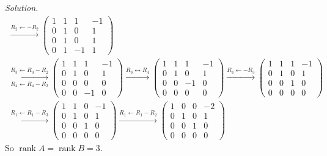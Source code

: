 \documentclass[12pt]{article}
\DeclareMathOperator{\rank}{rank}
\theoremstyle{definition}
\newenvironment{solution}{\par\noindent\textit{Solution.}\ }{\par\smallskip}
\begin{document}
\begin{solution}
\[\begin{gathered}
\xrightarrow{R_2\leftarrow-R_2}
\begin{pmatrix}1&1&1&-1\\0&1&0&1\\0&1&0&1\\0&1&-1&1\end{pmatrix}
\\
\xrightarrow[R_4\leftarrow R_4-R_2]{R_3\leftarrow R_3-R_2}
\begin{pmatrix}1&1&1&-1\\0&1&0&1\\0&0&0&0\\0&0&-1&0\end{pmatrix}
\xrightarrow{R_3\leftrightarrow R_4}
\begin{pmatrix}1&1&1&-1\\0&1&0&1\\0&0&-1&0\\0&0&0&0\end{pmatrix}
\xrightarrow{R_3\leftarrow-R_3}
\begin{pmatrix}1&1&1&-1\\0&1&0&1\\0&0&1&0\\0&0&0&0\end{pmatrix}
\\
\xrightarrow{R_1\leftarrow R_1-R_3}
\begin{pmatrix}1&1&0&-1\\0&1&0&1\\0&0&1&0\\0&0&0&0\end{pmatrix}
\xrightarrow{R_1\leftarrow R_1-R_2}
\begin{pmatrix}1&0&0&-2\\0&1&0&1\\0&0&1&0\\0&0&0&0\end{pmatrix}
\end{gathered}
\]
So \(\rank A=\rank B=3\).


\end{solution}
\end{document}
